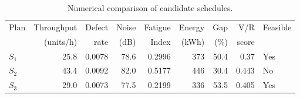 \begin{table}[htbp]
\centering
\caption{Numerical comparison of candidate schedules.}
\label{tab:numerical-sim}
\small
\begin{tabular}{@{}lrrrrrrrl@{}}
\toprule
Plan & Throughput & Defect & Noise & Fatigue & Energy & Gap & V/R & Feasible \\
     & (units/h)  & rate   & (dB)  & Index   & (kWh)  & (\%) & score &         \\
\midrule
$S_{1}$ & 25.8 & 0.0078 & 78.6 & 0.2996 & 373 & 50.4 & 0.37 & Yes \\
$S_{2}$ & 43.4 & 0.0092 & 82.0 & 0.5177 & 446 & 30.4 & 0.443 & No \\
$S_{3}$ & 29.0 & 0.0073 & 77.5 & 0.2199 & 336 & 53.5 & 0.405 & Yes \\
\bottomrule
\end{tabular}
\end{table}
